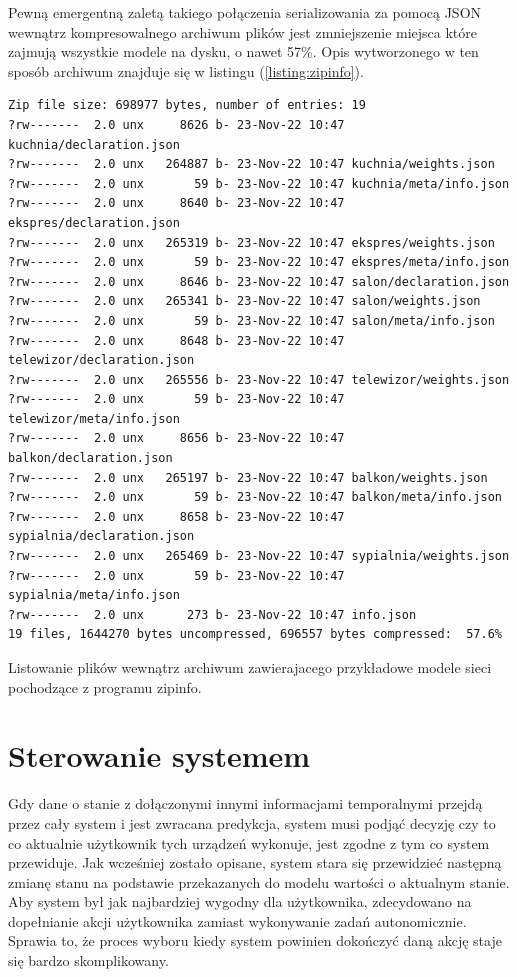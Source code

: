 Pewną emergentną zaletą takiego połączenia serializowania za pomocą JSON wewnątrz kompresowalnego archiwum plików jest zmniejszenie miejsca które zajmują wszystkie modele na dysku, o nawet 57\%. Opis wytworzonego w ten sposób archiwum znajduje się w listingu (\ref{listing:zipinfo}).

\begin{listing}
\begin{verbatim}
Zip file size: 698977 bytes, number of entries: 19
?rw-------  2.0 unx     8626 b- 23-Nov-22 10:47 kuchnia/declaration.json
?rw-------  2.0 unx   264887 b- 23-Nov-22 10:47 kuchnia/weights.json
?rw-------  2.0 unx       59 b- 23-Nov-22 10:47 kuchnia/meta/info.json
?rw-------  2.0 unx     8640 b- 23-Nov-22 10:47 ekspres/declaration.json
?rw-------  2.0 unx   265319 b- 23-Nov-22 10:47 ekspres/weights.json
?rw-------  2.0 unx       59 b- 23-Nov-22 10:47 ekspres/meta/info.json
?rw-------  2.0 unx     8646 b- 23-Nov-22 10:47 salon/declaration.json
?rw-------  2.0 unx   265341 b- 23-Nov-22 10:47 salon/weights.json
?rw-------  2.0 unx       59 b- 23-Nov-22 10:47 salon/meta/info.json
?rw-------  2.0 unx     8648 b- 23-Nov-22 10:47 telewizor/declaration.json
?rw-------  2.0 unx   265556 b- 23-Nov-22 10:47 telewizor/weights.json
?rw-------  2.0 unx       59 b- 23-Nov-22 10:47 telewizor/meta/info.json
?rw-------  2.0 unx     8656 b- 23-Nov-22 10:47 balkon/declaration.json
?rw-------  2.0 unx   265197 b- 23-Nov-22 10:47 balkon/weights.json
?rw-------  2.0 unx       59 b- 23-Nov-22 10:47 balkon/meta/info.json
?rw-------  2.0 unx     8658 b- 23-Nov-22 10:47 sypialnia/declaration.json
?rw-------  2.0 unx   265469 b- 23-Nov-22 10:47 sypialnia/weights.json
?rw-------  2.0 unx       59 b- 23-Nov-22 10:47 sypialnia/meta/info.json
?rw-------  2.0 unx      273 b- 23-Nov-22 10:47 info.json
19 files, 1644270 bytes uncompressed, 696557 bytes compressed:  57.6%
\end{verbatim}
\caption{Listowanie plików wewnątrz archiwum zawierajacego przykładowe modele sieci pochodzące z programu zipinfo.} \label{listing:zipinfo}
\end{listing}

\section{Sterowanie systemem}
Gdy dane o stanie z dołączonymi innymi informacjami temporalnymi przejdą przez cały system i jest zwracana predykcja, system musi podjąć decyzję czy to co aktualnie użytkownik tych urządzeń wykonuje, jest zgodne z tym co system przewiduje. Jak wcześniej zostało opisane, system stara się przewidzieć następną zmianę stanu na podstawie przekazanych do modelu wartości o aktualnym stanie. Aby system był jak najbardziej wygodny dla użytkownika, zdecydowano na dopełnianie akcji użytkownika zamiast wykonywanie zadań autonomicznie. Sprawia to, że proces wyboru kiedy system powinien dokończyć daną akcję staje się bardzo skomplikowany.

